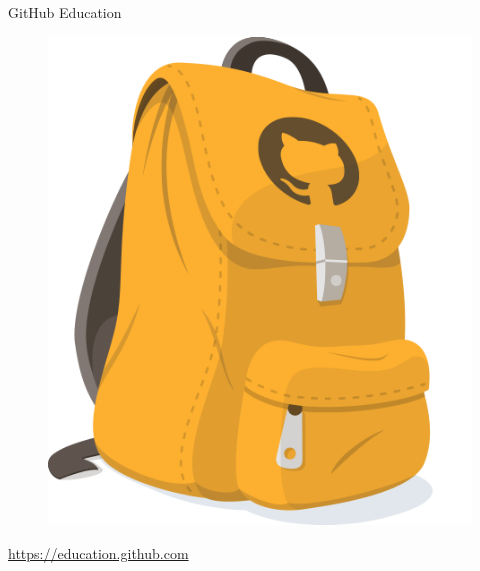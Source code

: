 \begin{frame}{GitHub Education}
  \begin{center}
  \begin{figure}
    \includegraphics[scale=0.2]{images/githubEducation}
  \end{figure}
  \href{https://education.github.com}{\Large{https://education.github.com}}
  \end{center}

\end{frame}
